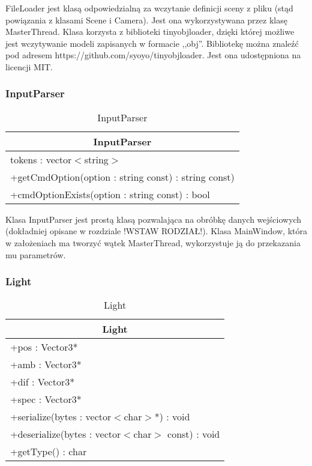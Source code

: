FileLoader jest klasą odpowiedzialną za wczytanie definicji sceny z pliku (stąd powiązania z klasami Scene i Camera). Jest ona wykorzystywana przez klasę MasterThread. Klasa korzysta z biblioteki tinyobjloader, dzięki której możliwe jest wczytywanie modeli zapisanych w formacie ,,obj''. Bibliotekę można znaleźć pod adresem https://github.com/syoyo/tinyobjloader. Jest ona udostępniona na licencji MIT.

\subsubsection{InputParser}

\footnotesize
\begin{longtable}{|p{14cm}|}
    \caption{InputParser} \label{tab:InputParser} \\ \hline
    \multicolumn{1}{|c|}{InputParser} \\ \hline
    tokens : vector$<$string$>$  \\ \hline
    +getCmdOption(option : string const) : string const) \\
    +cmdOptionExists(option : string const) : bool \\ \hline
\end{longtable}
\normalsize

Klasa InputParser jest prostą klasą pozwalająca na obróbkę danych wejściowych (dokładniej opisane w rozdziale !WSTAW RODZIAŁ!). Klasa MainWindow, która w założeniach ma tworzyć wątek MasterThread, wykorzystuje ją do przekazania mu parametrów.

\subsubsection{Light}

\footnotesize
\begin{longtable}{|p{14cm}|}
    \caption{Light} \label{tab:Light} \\ \hline
    \multicolumn{1}{|c|}{Light} \\ \hline
    +pos : Vector3* \\ 
    +amb : Vector3* \\
    +dif : Vector3* \\
    +spec : Vector3* \\
    \hline
	+serialize(bytes : vector$<$char$>$*) : void \\ 
	+deserialize(bytes : vector$<$char$>$ const) : void \\
	+getType() : char \\
	\hline
\end{longtable}
\normalsize

